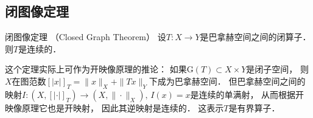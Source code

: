\subsection{闭图像定理}
\begin{theorem}{闭图像定理 （Closed Graph Theorem）}
设$T:X\to Y$是巴拿赫空间之间的闭算子． 则$T$是连续的．
\end{theorem}
这个定理实际上可作为开映像原理的推论： 如果$\text{G}(T)\subset X\times Y$是闭子空间， 则$X$在图范数$[|x|]_T=\|x\|_X+\|Tx\|_Y$下成为巴拿赫空间． 但巴拿赫空间之间的映射$I:(X,[|\cdot|]_T)\to(X,\|\cdot\|_X),\,I(x)=x$是连续的单满射， 从而根据开映像原理它也是开映射， 因此其逆映射是连续的． 这表示$T$是有界算子．
